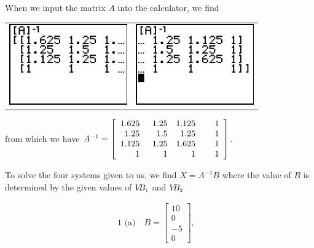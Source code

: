 \begin{ex}
\begin{enumerate}
When we input the matrix $A$ into the calculator, we find

\begin{center}

\begin{tabular}{cc}

\includegraphics[width=2in]{./MatricesGraphics/MATRIXINVERSE01.jpg} &

\hspace{0.75in} \includegraphics[width=2in]{./MatricesGraphics/MATRIXINVERSE02.jpg}  \\

\end{tabular}

\end{center}

from which we have  $A^{-1} = \left[ \begin{array}{rrrr} 1.625 & \hphantom{2}1.25 & 1.125 & \hphantom{2.2}1  \\ 1.25 & 1.5 & 1.25 & 1 \\ 1.125 & 1.25 & 1.625 & 1 \\ 1 & 1 & 1 & 1 \end{array} \right]$. 

To solve the four systems given to us, we find $X=A^{-1}B$ where the value of $B$ is determined by the given values of $V\!\!B_{\mbox{\tiny$1$}}$ and $V\!\!B_{\mbox{\tiny$2$}}$

\[\begin{array}{cccc}

\text{1 (a)} \quad B = \left[ \begin{array}{r} 10 \\ 0 \\ -5 \\ 0 \end{array} \right], & 


\end{array}\]
\end{enumerate}
\end{ex}
